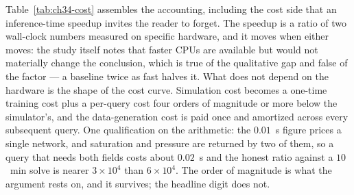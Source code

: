Table~\ref{tab:ch34-cost} assembles the accounting, including the cost side that
an inference-time speedup invites the reader to forget. The speedup is a ratio of
two wall-clock numbers measured on specific hardware, and it moves when either
moves: the study itself notes that faster CPUs are available but would not
materially change the conclusion, which is true of the qualitative gap and false of
the factor --- a baseline twice as fast halves it. What does not depend on the
hardware is the shape of the cost curve. Simulation cost becomes a one-time
training cost plus a per-query cost four orders of magnitude or more below the
simulator's, and the data-generation cost is paid once and amortized across every
subsequent query. One qualification on the arithmetic: the $0.01$~s figure prices a
single network, and saturation and pressure are returned by two of them, so a query
that needs both fields costs about $0.02$~s and the honest ratio against a
$10$~min solve is nearer $3\times 10^{4}$ than $6\times 10^{4}$. The order of
magnitude is what the argument rests on, and it survives; the headline digit does
not.

